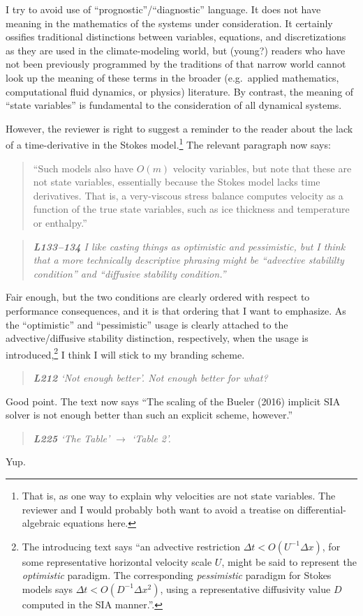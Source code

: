 \documentclass[letterpaper,final,12pt,reqno]{amsart}
\newenvironment{review}%
{\bigskip \par \begin{quote} \selectfont \sl}%
{\end{quote}}
\begin{document}
\noindent I try to avoid use of ``prognostic''/``diagnostic'' language.  It does not have meaning in the mathematics of the systems under consideration.  It certainly ossifies traditional distinctions between variables, equations, and discretizations as they are used in the climate-modeling world, but (young?) readers who have not been previously programmed by the traditions of that narrow world cannot look up the meaning of these terms in the broader (e.g.~applied mathematics, computational fluid dynamics, or physics) literature.  By contrast, the meaning of ``state variables'' is fundamental to the consideration of all dynamical systems.

However, the reviewer is right to suggest a reminder to the reader about the lack of a time-derivative in the Stokes model.\footnote{That is, as one way to explain why velocities are not state variables.  The reviewer and I would probably both want to avoid a treatise on differential-algebraic equations here.}  The relevant paragraph now says:

\begin{quote}
``Such models also have $O(m)$ velocity variables, but note that these are not state variables, essentially because the Stokes model lacks time derivatives.  That is, a very-viscous stress balance computes velocity as a function of the true state variables, such as ice thickness and temperature or enthalpy.''
\end{quote}

\begin{review}
\textbf{L133--134} I like casting things as optimistic and pessimistic, but I think that a more technically descriptive phrasing might be ``advective stabililty condition'' and ``diffusive stability condition.''
\end{review}

\noindent Fair enough, but the two conditions are clearly ordered with respect to performance consequences, and it is that ordering that I want to emphasize.  As the ``optimistic'' and ``pessimistic'' usage is clearly attached to the advective/diffusive stability distinction, respectively, when the usage is introduced,\footnote{The introducing text says ``an advective restriction $\Delta t < O(U^{-1} \Delta x)$, for some representative horizontal velocity scale $U$, might be said to represent the \emph{optimistic} paradigm.  The corresponding \emph{pessimistic} paradigm for Stokes models says $\Delta t < O(D^{-1} \Delta x^2)$, using a representative diffusivity value $D$ computed in the SIA manner.''.} I think I will stick to my branding scheme.

\begin{review}
\textbf{L212} `Not enough better'.  Not enough better for what?
\end{review}

\noindent Good point.  The text now says ``The scaling of the Bueler (2016) implicit SIA solver is not enough better than such an explicit scheme, however.''

\begin{review}
\textbf{L225} `The Table' $\to$ `Table 2'.
\end{review}

\noindent Yup.
\end{document}
